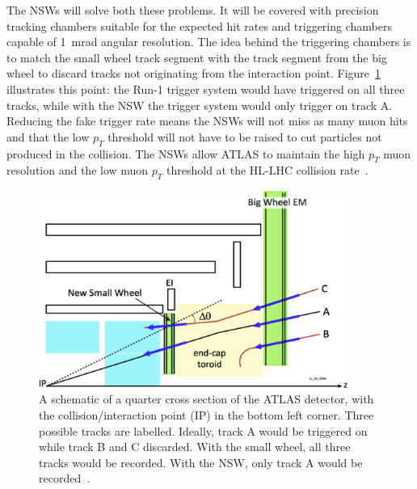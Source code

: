The NSWs will solve both these problems. It will be covered with precision tracking chambers suitable for the expected hit rates and triggering chambers capable of \SI{1}{mrad} angular resolution. The idea behind the triggering chambers is to match the small wheel track segment with the track segment from the big wheel to discard tracks not originating from the interaction point. Figure~\ref{fig:nsw_track_triggering} illustrates this point: the Run-1 trigger system would have triggered on all three tracks, while with the NSW the trigger system would only trigger on track A. Reducing the fake trigger rate means the NSWs will not miss as many muon hits and that the low $p_T$ threshold will not have to be raised to cut particles not produced in the collision. The NSWs allow ATLAS to maintain the high $p_T$ muon resolution and the low muon $p_T$ threshold at the HL-LHC collision rate~\cite{nsw_tdr}.


\begin{figure}
    \centering
    \includegraphics[width = 0.9\textwidth]{figures/perez-codina_NSW_tracks.jpg}
    \caption{A schematic of a quarter cross section of the ATLAS detector, with the collision/interaction point (IP) in the bottom left corner. Three possible tracks are labelled. Ideally, track A would be triggered on while track B and C discarded. With the small wheel, all three tracks would be recorded. With the NSW, only track A would be recorded~\cite{nsw_tdr}.}
    \label{fig:nsw_track_triggering}
\end{figure}

